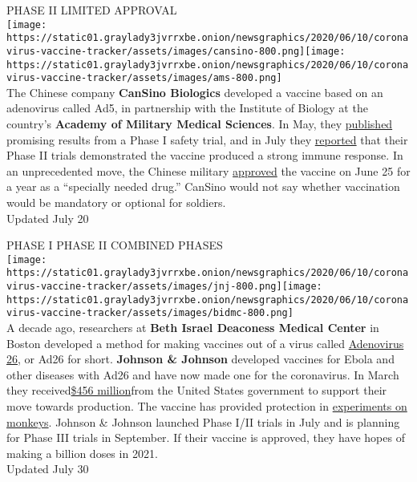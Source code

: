 PHASE II LIMITED APPROVAL\\
\texttt{[image: https://static01.graylady3jvrrxbe.onion/newsgraphics/2020/06/10/coronavirus-vaccine-tracker/assets/images/cansino-800.png]}\texttt{[image: https://static01.graylady3jvrrxbe.onion/newsgraphics/2020/06/10/coronavirus-vaccine-tracker/assets/images/ams-800.png]}\\
The Chinese company \textbf{CanSino Biologics} developed a vaccine based
on an adenovirus called Ad5, in partnership with the Institute of
Biology at the country's \textbf{Academy of Military Medical Sciences}.
In May, they
\href{https://www.nytimes3xbfgragh.onion/2020/05/22/health/coronavirus-vaccine-china.html}{published}
promising results from a Phase I safety trial, and in July they
\href{https://www.thelancet.com/lancet/article/s0140-6736(20)31605-6}{reported}
that their Phase II trials demonstrated the vaccine produced a strong
immune response. In an unprecedented move, the Chinese military
\href{https://www.nytimes3xbfgragh.onion/2020/07/16/business/china-vaccine-coronavirus.html}{approved}
the vaccine on June 25 for a year as a ``specially needed drug.''
CanSino would not say whether vaccination would be mandatory or optional
for soldiers.\\
Updated July 20

PHASE I PHASE II COMBINED PHASES\\
\texttt{[image: https://static01.graylady3jvrrxbe.onion/newsgraphics/2020/06/10/coronavirus-vaccine-tracker/assets/images/jnj-800.png]}\texttt{[image: https://static01.graylady3jvrrxbe.onion/newsgraphics/2020/06/10/coronavirus-vaccine-tracker/assets/images/bidmc-800.png]}\\
A decade ago, researchers at \textbf{Beth Israel Deaconess Medical
Center} in Boston developed a method for making vaccines out of a virus
called
\href{https://www.nytimes3xbfgragh.onion/2020/07/17/health/coronavirus-vaccine-johnson-janssen.html}{Adenovirus
26}, or Ad26 for short. \textbf{Johnson \& Johnson} developed vaccines
for Ebola and other diseases with Ad26 and have now made one for the
coronavirus. In March they
received\href{https://www.jnj.com/johnson-johnson-announces-a-lead-vaccine-candidate-for-covid-19-landmark-new-partnership-with-u-s-department-of-health-human-services-and-commitment-to-supply-one-billion-vaccines-worldwide-for-emergency-pandemic-use}{\$456
million}from the United States government to support their move towards
production. The vaccine has provided protection in
\href{https://www.nytimes3xbfgragh.onion/2020/07/30/health/covid-19-vaccine-monkeys.html}{experiments
on monkeys}. Johnson \& Johnson launched Phase I/II trials in July and
is planning for Phase III trials in September. If their vaccine is
approved, they have hopes of making a billion doses in 2021.\\
Updated July 30

